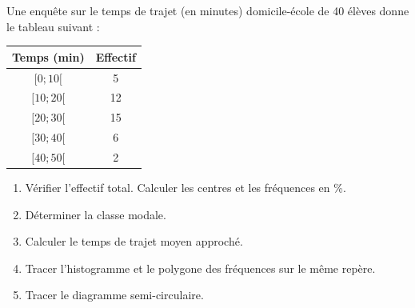 \documentclass[11pt]{article}
\begin{document}
\begin{exercice}
Une enquête sur le temps de trajet (en minutes) domicile-école de 40 élèves donne le tableau suivant :
\begin{center}
\begin{tabular}{|c|c|}\hline
\textbf{Temps (min)} & \textbf{Effectif} \\ \hline
$[0 ; 10[$ & 5 \\ \hline
$[10 ; 20[$ & 12 \\ \hline
$[20 ; 30[$ & 15 \\ \hline
$[30 ; 40[$ & 6 \\ \hline
$[40 ; 50[$ & 2 \\ \hline
\end{tabular}
\end{center}
\begin{enumerate}
    \item Vérifier l'effectif total. Calculer les centres et les fréquences en \%.
    \item Déterminer la classe modale. 
    \item Calculer le temps de trajet moyen approché.
    \item Tracer l'histogramme et le polygone des fréquences sur le même repère.
    \item Tracer le diagramme semi-circulaire.
\end{enumerate}
\end{exercice}
\end{document}
